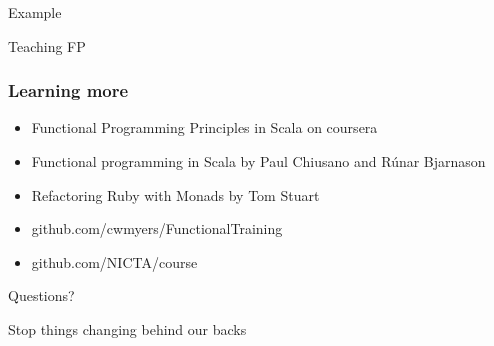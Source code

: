\documentclass[aspectratio=169]{beamer}
\begin{document}
\begin{frame}
  \begin{center}
    \Huge Example
  \end{center}
\end{frame}

\begin{frame}
  \begin{center}
    \Huge Teaching FP
  \end{center}
\end{frame}

\begin{frame}
  \frametitle{Learning more}
  \begin{itemize}
    \item Functional Programming Principles in Scala on coursera
    \item Functional programming in Scala by Paul Chiusano and Rúnar Bjarnason
    \item Refactoring Ruby with Monads by Tom Stuart
    \item github.com/cwmyers/FunctionalTraining
    \item github.com/NICTA/course
  \end{itemize}
\end{frame}

\begin{frame}
  \begin{center}
    \Huge Questions?
  \end{center}
\end{frame}

\begin{frame}
  \begin{center}
    \Huge Stop things changing behind our backs
  \end{center}
\end{frame}
\end{document}
